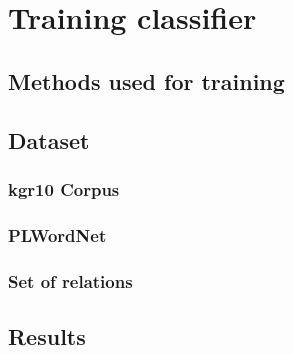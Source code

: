 \chapter{Training classifier}

\section{Methods used for training}

\section{Dataset}

\subsection{kgr10 Corpus}

\subsection{PLWordNet}

\subsection{Set of relations}

\section{Results}
